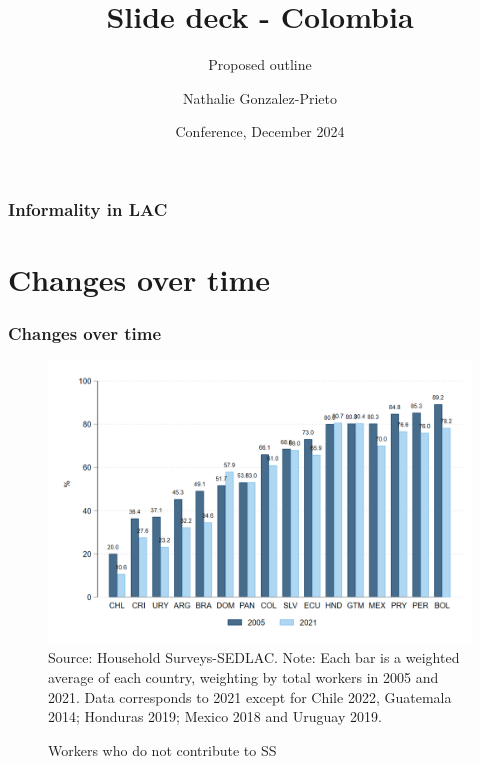\documentclass{beamer}
\title[Slide deck - Colombia] %
{Slide deck - Colombia}
\subtitle{Proposed outline}
\author{Nathalie Gonzalez-Prieto} %
\institute{World Bank} %
\date[WB 2024] %
{Conference, December 2024}
\begin{document}
\frame{\titlepage}


\begin{frame}
\frametitle{Informality in LAC}
\tableofcontents
\end{frame}


\section{Changes over time}


\begin{frame}
\frametitle{Changes over time}
\begin{figure}[!htb]
    \justifying
     \caption{Workers who do not contribute to SS}     
     \includegraphics[width=0.5\linewidth]{latex/figures/Snapshot/snapshot_informal_ss.png}
    \label{fig:SalariedSS}
    \footnotesize{Source: Household Surveys-SEDLAC.}
    \footnotesize{Note: Each bar is a weighted average of each country, weighting by total workers in 2005 and 2021.  Data corresponds to 2021 except for Chile 2022, Guatemala 2014; Honduras 2019; Mexico 2018 and Uruguay 2019.}
\end{figure}
    
\end{frame}


\end{document}
